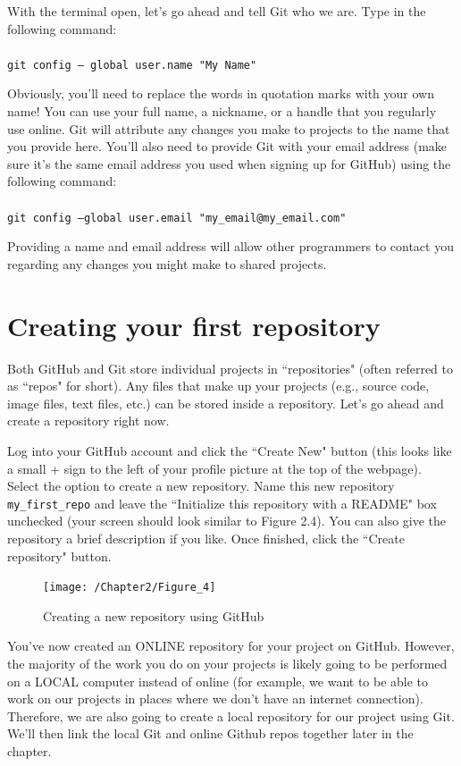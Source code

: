 \documentclass{book}
\begin{document}
With the terminal open, let's go ahead and tell Git who we are. Type in the following command:\\ \\ \texttt{git config -- global user.name "My Name"}

Obviously, you'll need to replace the words in quotation marks with your own name! You can use your full name, a nickname, or a handle that you regularly use online. Git will attribute any changes you make to projects to the name that you provide here. You'll also need to provide Git with your email address (make sure it's the same email address you used when signing up for GitHub) using the following command: \\ \\ \texttt{git config --global user.email "my\_email@my\_email.com"}

Providing a name and email address will allow other programmers to contact you regarding any changes you might make to shared projects.

\section{Creating your first repository}

Both GitHub and Git store individual projects in ``repositories" (often referred to as ``repos" for short). Any files that make up your projects (e.g., source code, image files, text files, etc.) can be stored inside a repository. Let's go ahead and create a repository right now. 

Log into your GitHub account and click the ``Create New" button (this looks like a small + sign to the left of your profile picture at the top of the webpage). Select the option to create a new repository. Name this new repository \texttt{my\_first\_repo} and leave the ``Initialize this repository with a README" box unchecked (your screen should look similar to Figure 2.4). You can also give the repository a brief description if you like. Once finished, click the ``Create repository" button. 

\begin{figure}[h]
	\caption{Creating a new repository using GitHub}
	\centering\texttt{[image: /Chapter2/Figure\_4]}
\end{figure}

You've now created an ONLINE repository for your project on GitHub. However, the majority of the work you do on your projects is likely going to be performed on a LOCAL computer instead of online (for example, we want to be able to work on our projects in places where we don't have an internet connection). Therefore, we are also going to create a local repository for our project using Git. We'll then link the local Git and online Github repos together later in the chapter.
\end{document}
